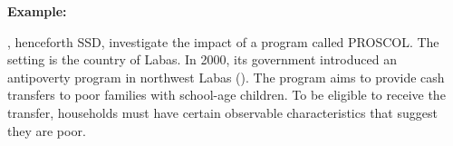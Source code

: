 \documentclass[12pt,a4paper]{article}
\begin{document}




\textbf{Example:} 

\cite{analyst_2022}, henceforth SSD, investigate the impact of a program called PROSCOL. The setting is the country of Labas. In 2000, its government introduced an antipoverty program in northwest Labas (\cite{ravallion2001mystery}). The program aims to provide cash transfers to poor families with school-age children. To be eligible to receive the transfer, households must have certain observable characteristics that suggest they are poor.
\end{document}
